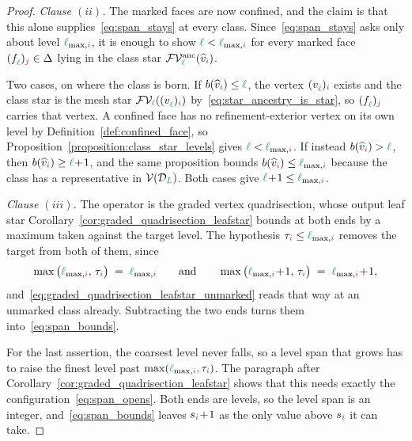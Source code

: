 \documentclass[a4paper, 12pt]{article}
\makeatletter
\newcommand{\lmaxIdx}[1]{\l_{\max,#1}}
\newcommand{\levelSpan}[1]{s_{#1}}
\newcommand{\targetlevel}{\tau}                                 %
\newcommand{\green}{\color{ForestGreen}}
\newcommand{\brickred}{\color{BrickRed}}
\newcommand{\V}{\mathcal{V}}
\newcommand{\F}{\mathcal{F}}
\DeclareRobustCommand{\simplexsubsetTwo}[2][]{\Delta\ifx\@empty#1\@empty\else^{#1}\fi_{#2}}
\newcommand{\vertex}[2]{\freeQ{v}{}{#1}{#2}}
\newcommand{\vertexClass}[1]{\widehat{v}_{#1}}
\newcommand{\face}[2]{\freeQ{f}{}{#1}{#2}}
\newcommand{\FVl}[1]{\F\V_{#1}}
\newcommand{\coarseIdxone}{{\brickred i}}
\newcommand{\fineIdxone}{{\brickred j}}
\renewcommand{\l}{{\green\ell}}
\renewcommand{\L}{{\green L}}
\newcommand{\freeQ}[4]{ ( {#1}^{#2}_{#3} )_{#4}}
\theoremstyle{definition}
\theoremstyle{plain}
\numberwithin{equation}{section}
\DeclareRobustCommand{\domseq}[1][]{\mathcal{D}\ifx\@empty#1\@empty\else_{#1}\fi}
\newcommand{\birthLevel}{b}
\newcommand{\FVanc}[1]{\F\V^{\mathrm{anc}}_{#1}}            %
\makeatother
\begin{document}
\begin{proof}
    \emph{Clause $(ii)$.} The marked faces are now confined, and the claim is that this alone supplies~\eqref{eq:span_stays} at every class. Since~\eqref{eq:span_stays} asks only about level $\lmaxIdx{\coarseIdxone}$, it is enough to show $\l < \lmaxIdx{\coarseIdxone}$ for every marked face $\face{\l}{\fineIdxone} \in \simplexsubsetTwo{}$ lying in the class star $\FVanc{\l}(\vertexClass{\coarseIdxone})$.

    Two cases, on where the class is born. If $\birthLevel(\vertexClass{\coarseIdxone}) \leq \l$, the vertex $\vertex{\l}{\coarseIdxone}$ exists and the class star is the mesh star $\FVl{\l}(\vertex{\l}{\coarseIdxone})$ by~\eqref{eq:star_ancestry_is_star}, so $\face{\l}{\fineIdxone}$ carries that vertex. A confined face has no refinement-exterior vertex on its own level by Definition~\ref{def:confined_face}, so Proposition~\ref{proposition:class_star_levels} gives $\l < \lmaxIdx{\coarseIdxone}$. If instead $\birthLevel(\vertexClass{\coarseIdxone}) > \l$, then $\birthLevel(\vertexClass{\coarseIdxone}) \geq \l \! + \! 1$, and the same proposition bounds $\birthLevel(\vertexClass{\coarseIdxone}) \leq \lmaxIdx{\coarseIdxone}$ because the class has a representative in $\V(\domseq[\L])$. Both cases give $\l \! + \! 1 \leq \lmaxIdx{\coarseIdxone}$.

    \emph{Clause $(iii)$.} The operator is the graded vertex quadrisection, whose output leaf star Corollary~\ref{cor:graded_quadrisection_leafstar} bounds at both ends by a maximum taken against the target level. The hypothesis $\targetlevel_\coarseIdxone \leq \lmaxIdx{\coarseIdxone}$ removes the target from both of them, since
    \begin{equation*}
        \max \big( \lmaxIdx{\coarseIdxone}, \, \targetlevel_\coarseIdxone \big) \; = \; \lmaxIdx{\coarseIdxone}
        \qquad \text{and} \qquad
        \max \big( \lmaxIdx{\coarseIdxone} \! + \! 1, \, \targetlevel_\coarseIdxone \big) \; = \; \lmaxIdx{\coarseIdxone} \! + \! 1 ,
    \end{equation*}
    and~\eqref{eq:graded_quadrisection_leafstar_unmarked} reads that way at an unmarked class already. Subtracting the two ends turns them into~\eqref{eq:span_bounds}.

    For the last assertion, the coarsest level never falls, so a level span that grows has to raise the finest level past $\max(\lmaxIdx{\coarseIdxone}, \targetlevel_\coarseIdxone)$. The paragraph after Corollary~\ref{cor:graded_quadrisection_leafstar} shows that this needs exactly the configuration~\eqref{eq:span_opens}. Both ends are levels, so the level span is an integer, and~\eqref{eq:span_bounds} leaves $\levelSpan{\coarseIdxone} \! + \! 1$ as the only value above $\levelSpan{\coarseIdxone}$ it can take.
\end{proof}
\end{document}
